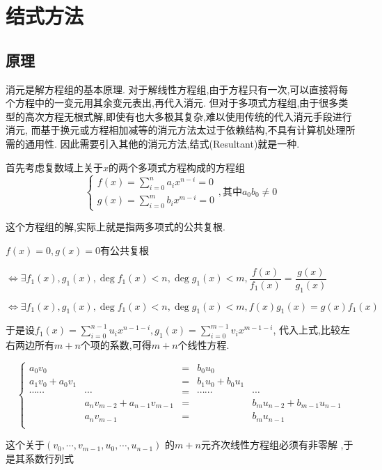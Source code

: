 \section{结式方法}
\subsection{原理}
	消元是解方程组的基本原理.
	对于解线性方程组,由于方程只有一次,可以直接将每个方程中的一变元用其余变元表出,再代入消元.
	但对于多项式方程组,由于很多类型的高次方程无根式解,即使有也大多极其复杂,难以使用传统的代入消元手段进行消元,
	而基于换元或方程相加减等的消元方法太过于依赖结构,不具有计算机处理所需的通用性.
	因此需要引入其他的消元方法,结式(Resultant)就是一种.

	首先考虑复数域上关于$ x$的两个多项式方程构成的方程组
	\[  \begin{cases} 
			f(x)=\sum_{i=0}^{n}{a_ix^{n-i}}=0 \\
			g(x)=\sum_{i=0}^{m}{b_ix^{m-i}}=0
	\end{cases} , \texttt{其中} a_0b_0\ne0\]

	这个方程组的解,实际上就是指两多项式的公共复根.

	$ f(x)=0,g(x)=0$有公共复根

	$ \Leftrightarrow \exists f_1(x), g_1(x), \deg f_1(x) < n, \deg g_1(x) < m, \dfrac{f(x)}{f_1(x)} = \dfrac{g(x)}{g_1(x)}$

	$ \Leftrightarrow \exists f_1(x),g_1(x),\deg f_1(x)<n,\deg g_1(x)<m,f(x)g_1(x)=g(x)f_1(x)$

	于是设$ f_1(x)=\sum_{i=0}^{n-1}{u_ix^{n-1-i}},g_1(x)=\sum_{i=0}^{m-1}{v_ix^{m-1-i}}$,
	代入上式,比较左右两边所有$ m+n$个项的系数,可得$ m+n$个线性方程.

	\[ \left \{  \begin{array}{lrclr}
	a_0v_0		&			&= &b_0u_0		&		\\
	a_1v_0+a_0v_1&			&= &b_1u_0+b_0u_1&		\\
	\cdots \cdots &\cdots	&= & \cdots\cdots &\cdots		\\
			&{a_nv_{m-2}+a_{n-1}v_{m-1}}&=&		&b_mu_{n-2}+b_{m-1}u_{n-1}\\
			& a_nv_{m-1}&= &				&b_mu_{n-1}\\
	\end{array}\right . \]

	这个关于$(v_0,\cdots,v_{m-1},u_0,\cdots,u_{n-1})$ 的$ m+n$元齐次线性方程组必须有非零解
	,于是其系数行列式
	
